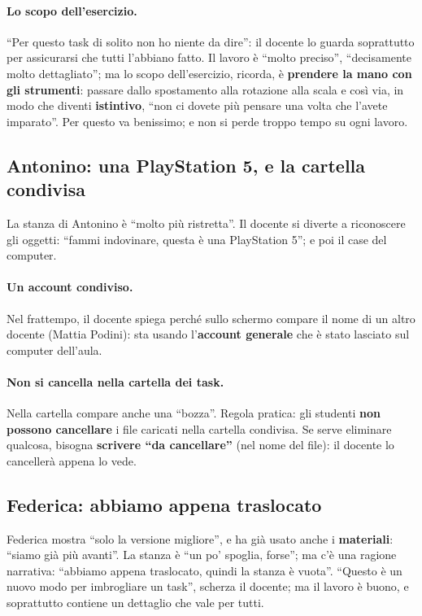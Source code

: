 \paragraph{Lo scopo dell'esercizio.} ``Per questo task di solito non ho niente
da dire'': il docente lo guarda soprattutto per assicurarsi che tutti
l'abbiano fatto. Il lavoro è ``molto preciso'', ``decisamente molto
dettagliato''; ma lo scopo dell'esercizio, ricorda, è \textbf{prendere la mano
con gli strumenti}: passare dallo spostamento alla rotazione alla scala e così
via, in modo che diventi \textbf{istintivo}, ``non ci dovete più pensare una
volta che l'avete imparato''. Per questo va benissimo; e non si perde troppo
tempo su ogni lavoro.

\subsection{Antonino: una PlayStation 5, e la cartella condivisa}

La stanza di Antonino è ``molto più ristretta''. Il docente si diverte a
riconoscere gli oggetti: ``fammi indovinare, questa è una PlayStation 5''; e
poi il case del computer.

\paragraph{Un account condiviso.} Nel frattempo, il docente spiega perché
sullo schermo compare il nome di un altro docente (Mattia Podini): sta usando
l'\textbf{account generale} che è stato lasciato sul computer dell'aula.

\paragraph{Non si cancella nella cartella dei task.} Nella cartella compare
anche una ``bozza''. Regola pratica: gli studenti \textbf{non possono
cancellare} i file caricati nella cartella condivisa. Se serve eliminare
qualcosa, bisogna \textbf{scrivere ``da cancellare''} (nel nome del file): il
docente lo cancellerà appena lo vede.

\subsection{Federica: abbiamo appena traslocato}

Federica mostra ``solo la versione migliore'', e ha già usato anche i
\textbf{materiali}: ``siamo già più avanti''. La stanza è ``un po' spoglia,
forse''; ma c'è una ragione narrativa: ``abbiamo appena traslocato, quindi la
stanza è vuota''. ``Questo è un nuovo modo per imbrogliare un task'', scherza
il docente; ma il lavoro è buono, e soprattutto contiene un dettaglio che vale
per tutti.

